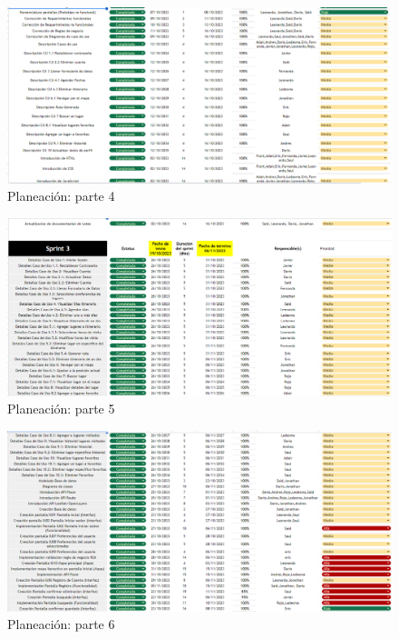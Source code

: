 \begin{figure}[h]
    \centering
    \includegraphics[width=1\linewidth]{entregable final/UltimaPlaneacion/Captura de pantalla 2023-12-18 100455.png}
    \caption{Planeación: parte 4}
    \label{fig:Planeación parte 1}
\end{figure}
\begin{figure}[h]
    \centering
    \includegraphics[width=1\linewidth]{entregable final/UltimaPlaneacion/Captura de pantalla 2023-12-18 100507.png}
    \caption{Planeación: parte 5}
    \label{fig:Planeación parte 1}
\end{figure}
\begin{figure}[h]
    \centering
    \includegraphics[width=1\linewidth]{entregable final/UltimaPlaneacion/Captura de pantalla 2023-12-18 100520.png}
    \caption{Planeación: parte 6}
    \label{fig:Planeación parte 1}
\end{figure}
